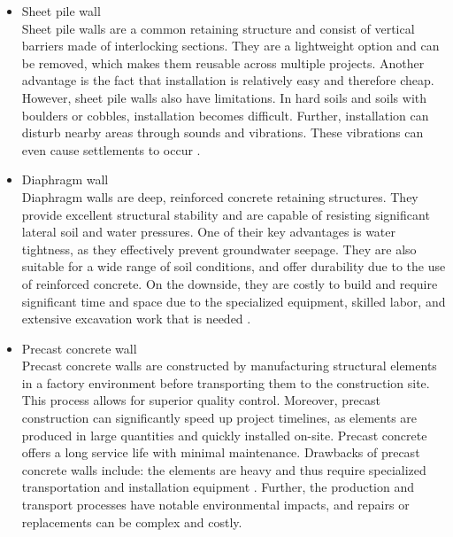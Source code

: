 \begin{itemize}
    \item Sheet pile wall\\
    Sheet pile walls are a common retaining structure and consist of vertical barriers made of interlocking sections. They are a lightweight option and can be removed, which makes them reusable across multiple projects. Another advantage is the fact that installation is relatively easy and therefore cheap. However, sheet pile walls also have limitations. In hard soils and soils with boulders or cobbles, installation becomes difficult. Further, installation can disturb nearby areas through sounds and vibrations. These vibrations can even cause settlements to occur \autocite{mandykorffReaderDeepExcavations2023}.

    \item Diaphragm wall\\
    Diaphragm walls are deep, reinforced concrete retaining structures. They provide excellent structural stability and are capable of resisting significant lateral soil and water pressures. One of their key advantages is water tightness, as they effectively prevent groundwater seepage. They are also suitable for a wide range of soil conditions, and offer durability due to the use of reinforced concrete. On the downside, they are costly to build and require significant time and space due to the specialized equipment, skilled labor, and extensive excavation work that is needed \autocite{mandykorffReaderDeepExcavations2023}.
    
    \item Precast concrete wall\\
    Precast concrete walls are constructed by manufacturing structural elements in a factory environment before transporting them to the construction site. This process allows for superior quality control. Moreover, precast construction can significantly speed up project timelines, as elements are produced in large quantities and quickly installed on-site. Precast concrete offers a long service life with minimal maintenance. Drawbacks of precast concrete walls include: the elements are heavy and thus require specialized transportation and installation equipment \autocite{mcneilengineeringAdvantagesDisadvantagesUsing2023}. Further, the production and transport processes have notable environmental impacts, and repairs or replacements can be complex and costly.


\end{itemize}
